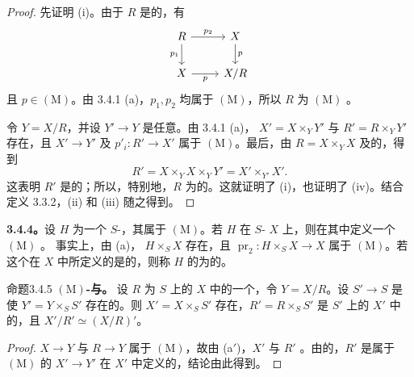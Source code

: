 \begin{proof}
先证明 (i)。由于 $R$ 是的，有
\[
\begin{tikzcd}R\arrow[r,"p_2"]\arrow[d,"p_1"']&X\arrow[d,"p"]\\X\arrow[r,"p"']&X/R\end{tikzcd}
\]
且 $p\in(\mathrm M)$。由 3.4.1 (a)，$p_1,p_2$ 均属于 $(\mathrm M)$，所以 $R$ 为 $(\mathrm M)$ 。

令 $Y=X/R$，并设 $Y'\to Y$ 是任意。由 3.4.1 (a)， $X'=X\times_Y Y'$ 与 $R'=R\times_Y Y'$ 存在，且 $X'\to Y'$ 及 $p'_i:R'\to X'$ 属于 $(\mathrm M)$。最后，由 $R=X\times_Y X$ 及的，得到
\[
 R'=X\times_Y X\times_Y Y'=X'\times_{Y'}X'.
\]
这表明 $R'$ 是的；所以，特别地，$R$ 为的。这就证明了 (i)，也证明了 (iv)。结合定义 3.3.2，(ii) 和 (iii) 随之得到。
\end{proof}
\textbf{3.4.4。}设 $H$ 为一个 $S$-，其属于 $(\mathrm M)$。若 $H$ 在 $S$- $X$ 上，则在其中定义一个 $(\mathrm M)$ 。
事实上，由 (a)， $H\times_S X$ 存在，且 $\operatorname{pr}_2:H\times_S X\to X$ 属于 $(\mathrm M)$。若这个在 $X$ 中所定义的是的，则称 $H$ 的为的。
\begin{SGAresult}{命题}{3.4.5}
\textbf{$(\mathrm M)$-与。}
设 $R$ 为 $S$ 上的 $X$ 中的一个，令 $Y=X/R$。设 $S'\to S$ 是使 $Y'=Y\times_S S'$ 存在的。则 $X'=X\times_S S'$ 存在，$R'=R\times_S S'$ 是 $S'$ 上的 $X'$ 中的，且 $X'/R'\simeq(X/R)'$。
\end{SGAresult}
\begin{proof}
 $X\to Y$ 与 $R\to Y$ 属于 $(\mathrm M)$，故由 (a$'$)，$X'$ 与 $R'$ 。由的，$R'$ 是属于 $(\mathrm M)$ 的 $X'\to Y'$ 在 $X'$ 中定义的，结论由此得到。
\end{proof}

